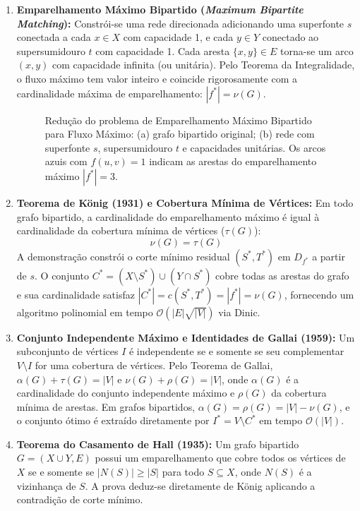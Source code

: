 \begin{enumerate}[leftmargin=1.5em, itemsep=0.15em, topsep=0.2em, parsep=0em]
    \item \textbf{Emparelhamento Máximo Bipartido (\textit{Maximum Bipartite Matching}):} Constrói-se uma rede direcionada adicionando uma superfonte $s$ conectada a cada $x \in X$ com capacidade 1, e cada $y \in Y$ conectado ao supersumidouro $t$ com capacidade 1. Cada aresta $\{x, y\} \in E$ torna-se um arco $(x, y)$ com capacidade infinita (ou unitária). Pelo Teorema da Integralidade, o fluxo máximo tem valor inteiro e coincide rigorosamente com a cardinalidade máxima de emparelhamento: $|f^*| = \nu(G)$.

\begin{figure}[!ht]
\centering

\caption{Redução do problema de Emparelhamento Máximo Bipartido para Fluxo Máximo: (a) grafo bipartido original; (b) rede com superfonte $s$, supersumidouro $t$ e capacidades unitárias. Os arcos azuis com $f(u, v) = 1$ indicam as arestas do emparelhamento máximo $|f^*| = 3$.}
\label{fig:fluxo_bipartido}
\end{figure}

    \item \textbf{Teorema de König (1931) e Cobertura Mínima de Vértices:} Em todo grafo bipartido, a cardinalidade do emparelhamento máximo é igual à cardinalidade da cobertura mínima de vértices ($\tau(G)$):
    \begin{equation}
        \nu(G) = \tau(G)
    \end{equation}
    A demonstração constrói o corte mínimo residual $(S^*, T^*)$ em $D_{f^*}$ a partir de $s$. O conjunto $C^* = (X \setminus S^*) \cup (Y \cap S^*)$ cobre todas as arestas do grafo e sua cardinalidade satisfaz $|C^*| = c(S^*, T^*) = |f^*| = \nu(G)$, fornecendo um algoritmo polinomial em tempo $\mathcal{O}(|E|\sqrt{|V|})$ via Dinic.

    \item \textbf{Conjunto Independente Máximo e Identidades de Gallai (1959):} Um subconjunto de vértices $I$ é independente se e somente se seu complementar $V \setminus I$ for uma cobertura de vértices. Pelo Teorema de Gallai, $\alpha(G) + \tau(G) = |V|$ e $\nu(G) + \rho(G) = |V|$, onde $\alpha(G)$ é a cardinalidade do conjunto independente máximo e $\rho(G)$ da cobertura mínima de arestas. Em grafos bipartidos, $\alpha(G) = \rho(G) = |V| - \nu(G)$, e o conjunto ótimo é extraído diretamente por $I^* = V \setminus C^*$ em tempo $\mathcal{O}(|V|)$.

    \item \textbf{Teorema do Casamento de Hall (1935):} Um grafo bipartido $G = (X \cup Y, E)$ possui um emparelhamento que cobre todos os vértices de $X$ se e somente se $|N(S)| \ge |S|$ para todo $S \subseteq X$, onde $N(S)$ é a vizinhança de $S$. A prova deduz-se diretamente de König aplicando a contradição de corte mínimo.
\end{enumerate}

